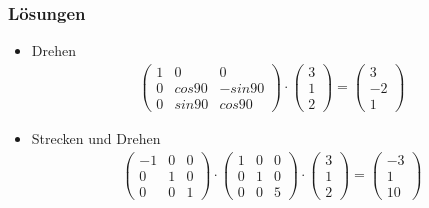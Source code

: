 \begin{frame}
	\frametitle{Lösungen}
	\begin{itemize}
		\item Drehen
		\begin{gather*} \begin{pmatrix}
			1 & 0 & 0 \\
			0 & cos{90} & -sin{90} \\
			0 & sin{90} & cos{90}
			\end{pmatrix} \cdot
			\begin{pmatrix}
				3 \\
				1 \\
				2
				\end{pmatrix} = \begin{pmatrix}
					3 \\
					-2 \\
					1
				\end{pmatrix} \end{gather*}
		\item Strecken und Drehen
		\begin{gather*} \begin{pmatrix}
				-1 & 0 & 0 \\
				0 & 1 & 0 \\
				0 & 0 & 1
				\end{pmatrix} \cdot
				\begin{pmatrix}
					1 & 0 & 0 \\
					0 & 1 & 0 \\
					0 & 0 & 5
				\end{pmatrix} \cdot \begin{pmatrix}
					3 \\
					1 \\
					2
				\end{pmatrix} = \begin{pmatrix}
					-3 \\
					1 \\
					10
				\end{pmatrix} \end{gather*}
	\end{itemize}
\end{frame}